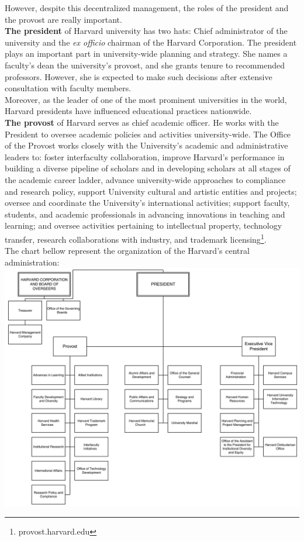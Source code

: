 \documentclass[10pt,a4paper]{article}
\begin{document}
However, despite this decentralized management, the roles of the president and the provost are really important.\\

\textbf{The president} of Harvard university has two hats: Chief administrator of the university and the \textit{ex officio} chairman of the Harvard Corporation.
The president plays an important part in university-wide planning and strategy. She names a faculty's dean the university's provost, and she grants tenure to recommended professors. However, she is expected to make such decisions after extensive consultation with faculty members.\\
Moreover, as the leader of one of the most prominent universities in the world, Harvard presidents have influenced educational practices nationwide.\\

\textbf{The provost} of Harvard serves as chief academic officer. He works with the President to oversee academic policies and activities university-wide. The Office of the Provost works closely with the University’s academic and administrative leaders to: foster interfaculty collaboration, improve Harvard’s performance in building a diverse pipeline of scholars and in developing scholars at all stages of the academic career ladder, advance university-wide approaches to compliance and research policy, support University cultural and artistic entities and projects; oversee and coordinate the University’s international activities; support faculty, students, and academic professionals in advancing innovations in teaching and learning; and oversee activities pertaining to intellectual property, technology transfer, research collaborations with industry, and trademark licensing\footnote{provost.harvard.edu}.\\
The chart bellow represent the organization of the Harvard's central administration:\\
\includegraphics[width=1\textwidth]{images/chart2.png}
\end{document}

